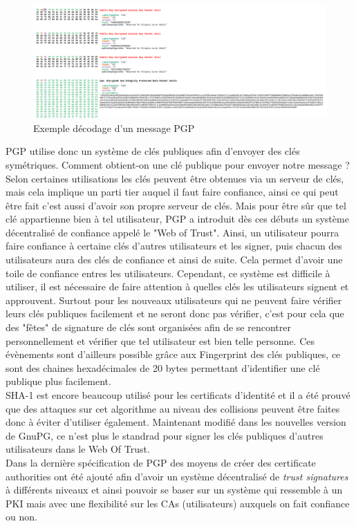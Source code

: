\begin{figure}[h!]
	\includegraphics[width=14cm]{images/examplePGPDecode.png}
	\centering
	\caption{Exemple décodage d'un message PGP}
	\label{fig:PGP_DECODE}
\end{figure}
PGP utilise donc un système de clés publiques afin d'envoyer des clés symétriques. Comment obtient-on une clé publique pour envoyer notre message ?\\
Selon certaines utilisations les clés peuvent être obtenues via un serveur de clés, mais cela implique un parti tier auquel il faut faire confiance, ainsi ce qui peut être fait c'est aussi d'avoir son propre serveur de clés. Mais pour être sûr que tel clé appartienne bien à tel utilisateur, PGP a introduit dès ces débuts un système décentralisé de confiance appelé le "Web of Trust". Ainsi, un utilisateur pourra faire confiance à certaine clés d'autres utilisateurs et les signer, puis chacun des utilisateurs aura des clés de confiance et ainsi de suite. Cela permet d'avoir une toile de confiance entres les utilisateurs. Cependant, ce système est difficile à utiliser, il est nécessaire de faire attention à quelles clés les utilisateurs signent et approuvent. Surtout pour les nouveaux utilisateurs qui ne peuvent faire vérifier leurs clés publiques facilement et ne seront donc pas vérifier, c'est pour cela que des "fêtes" de signature de clés sont organisées afin de se rencontrer personnellement et vérifier que tel utilisateur est bien telle personne. Ces évènements sont d'ailleurs possible grâce aux Fingerprint des clés publiques, ce sont des chaines hexadécimales de 20 bytes permettant d'identifier une clé publique plus facilement.\\
SHA-1 est encore beaucoup utilisé pour les certificats d'identité et il a été prouvé que des attaques sur cet algorithme au niveau des collisions peuvent être faites~\cite{DBLP:journals/iacr/LeurentP20} donc à éviter d'utiliser également. Maintenant modifié dans les nouvelles version de GnuPG, ce n'est plus le standrad pour signer les clés publiques d'autres utilisateurs dans le Web Of Trust.\\
Dans la dernière spécification de PGP des moyens de créer des certificate authorities ont été ajouté afin d'avoir un système décentralisé de \textit{trust signatures} à différents niveaux et ainsi pouvoir se baser sur un système qui ressemble à un PKI mais avec une flexibilité sur les CAs (utilisateurs) auxquels on fait confiance ou non.
